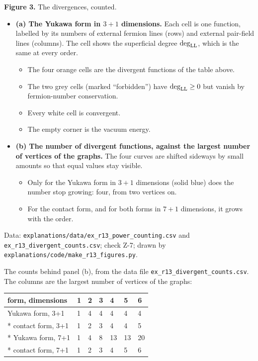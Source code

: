 \documentclass[
  10pt,
]{article}
\providecommand{\tightlist}{%
  \setlength{\itemsep}{0pt}\setlength{\parskip}{0pt}}
\begin{document}
\textbf{Figure 3.} The divergences, counted.

\begin{itemize}
\tightlist
\item
  \textbf{(a) The Yukawa form in \(3+1\) dimensions.} Each cell is one
  function, labelled by its numbers of external fermion lines (rows) and
  external pair-field lines (columns). The cell shows the superficial
  degree \(\deg_{\rm LL}\), which is the same at every order.

  \begin{itemize}
  \tightlist
  \item
    The four orange cells are the divergent functions of the table
    above.
  \item
    The two grey cells (marked ``forbidden'') have \(\deg_{\rm LL}\ge0\)
    but vanish by fermion-number conservation.
  \item
    Every white cell is convergent.
  \item
    The empty corner is the vacuum energy.
  \end{itemize}
\item
  \textbf{(b) The number of divergent functions, against the largest
  number of vertices of the graphs.} The four curves are shifted
  sideways by small amounts so that equal values stay visible.

  \begin{itemize}
  \tightlist
  \item
    Only for the Yukawa form in \(3+1\) dimensions (solid blue) does the
    number stop growing: four, from two vertices on.
  \item
    For the contact form, and for both forms in \(7+1\) dimensions, it
    grows with the order.
  \end{itemize}
\end{itemize}

Data: \texttt{explanations/data/ex\_r13\_power\_counting.csv} and
\texttt{ex\_r13\_divergent\_counts.csv}; check Z-7; drawn by
\texttt{explanations/code/make\_r13\_figures.py}.

The counts behind panel (b), from the data file
\texttt{ex\_r13\_divergent\_counts.csv}. The columns are the largest
number of vertices of the graphs:

\begin{longtable}[]{@{}lllllll@{}}
\toprule\noalign{}
form, dimensions & 1 & 2 & 3 & 4 & 5 & 6 \\
\midrule\noalign{}
\endhead
\bottomrule\noalign{}
\endlastfoot
Yukawa form, 3+1 & 1 & 4 & 4 & 4 & 4 & 4 \\*
contact form, 3+1 & 1 & 2 & 3 & 4 & 4 & 5 \\*
Yukawa form, 7+1 & 1 & 4 & 8 & 13 & 13 & 20 \\*
contact form, 7+1 & 1 & 2 & 3 & 4 & 5 & 6 \\
\end{longtable}
\end{document}
